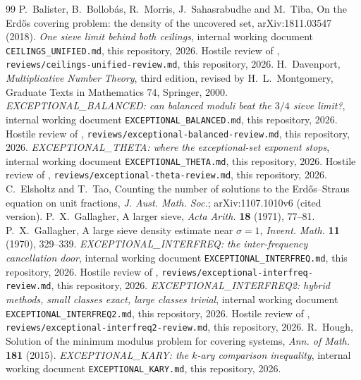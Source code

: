 \documentclass[10pt,reqno]{amsart}
\theoremstyle{definition}
\theoremstyle{remark}
\begin{document}
\begin{thebibliography}{99}
P.~Balister, B.~Bollob\'as, R.~Morris, J.~Sahasrabudhe and M.~Tiba, On the
Erd\H{o}s covering problem: the density of the uncovered set,
arXiv:1811.03547 (2018).
\emph{One sieve limit behind both ceilings}, internal working document
\texttt{CEILINGS\_UNIFIED.md}, this repository, 2026.
Hostile review of \cite{CU}, \texttt{reviews/ceilings-unified-review.md},
this repository, 2026.
H.~Davenport, \emph{Multiplicative Number Theory}, third edition, revised
by H.~L.~Montgomery, Graduate Texts in Mathematics 74, Springer, 2000.
\emph{EXCEPTIONAL\_BALANCED: can balanced moduli beat the $3/4$ sieve
limit?}, internal working document \texttt{EXCEPTIONAL\_BALANCED.md}, this
repository, 2026.
Hostile review of \cite{EB}, \texttt{reviews/exceptional-balanced-review.md},
this repository, 2026.
\emph{EXCEPTIONAL\_THETA: where the exceptional-set exponent stops},
internal working document \texttt{EXCEPTIONAL\_THETA.md}, this repository,
2026.
Hostile review of \cite{ET}, \texttt{reviews/exceptional-theta-review.md},
this repository, 2026.
C.~Elsholtz and T.~Tao, Counting the number of solutions to the
Erd\H{o}s--Straus equation on unit fractions, \emph{J. Aust. Math. Soc.};
arXiv:1107.1010v6 (cited version).
P.~X.~Gallagher, A larger sieve, \emph{Acta Arith.} \textbf{18} (1971),
77--81.
P.~X.~Gallagher, A large sieve density estimate near $\sigma=1$,
\emph{Invent. Math.} \textbf{11} (1970), 329--339.
\emph{EXCEPTIONAL\_INTERFREQ: the inter-frequency cancellation door},
internal working document \texttt{EXCEPTIONAL\_INTERFREQ.md}, this
repository, 2026.
Hostile review of \cite{IF}, \texttt{reviews/exceptional-interfreq-review.md},
this repository, 2026.
\emph{EXCEPTIONAL\_INTERFREQ2: hybrid methods, small classes exact, large
classes trivial}, internal working document
\texttt{EXCEPTIONAL\_INTERFREQ2.md}, this repository, 2026.
Hostile review of \cite{IF2}, \texttt{reviews/exceptional-interfreq2-review.md},
this repository, 2026.
R.~Hough, Solution of the minimum modulus problem for covering systems,
\emph{Ann. of Math.} \textbf{181} (2015).
\emph{EXCEPTIONAL\_KARY: the $k$-ary comparison inequality}, internal
working document \texttt{EXCEPTIONAL\_KARY.md}, this repository, 2026.

\end{thebibliography}
\end{document}
